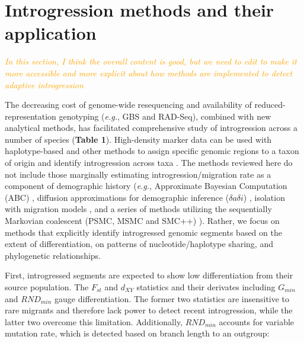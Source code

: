 \documentclass[11pt]{article}
\newcommand{\mbh}[1]{\textcolor{orange}{ \emph{\scriptsize  #1}} } %
\begin{document}
\section*{Introgression methods and their application}

\mbh{In this section, I think the overall content is good, but we need to edit to make it more accessible and more explicit about how methods are implemented to detect adaptive introgression}

The decreasing cost of genome-wide resequencing and availability of reduced-representation genotyping (\emph{e.g.}, GBS and RAD-Seq), combined with new analytical methods, has facilitated comprehensive study of introgression across a number of species (\textbf{Table 1}).
High-density marker data can be used with haplotype-based and other methods to assign specific genomic regions to a taxon of origin and identify introgression across taxa \cite{Martin2015,Price2009,Lawson2012,pease2015,rosenzweig2016,geneva2015}.
The methods reviewed here do not include those marginally estimating introgression\slash migration rate as a component of demographic history (\emph{e.g.}, Approximate Bayesian Computation (ABC) \cite{beaumont2002}, diffusion approximations for demographic inference ($\delta a\delta i$) \cite{gutenkunst2009}, isolation with migration models \cite{hey2004}, and a series of methods utilizing the sequentially Markovian coalescent (PSMC, MSMC and SMC++) \cite{li2011, schiffels2014, terhorst2017}). 
Rather, we focus on methods that explicitly identify introgressed genomic segments based on the extent of differentiation, on patterns of nucleotide/haplotype sharing, and phylogenetic relationships.

First, introgressed segments are expected to show low differentiation from their source population.
The $F_{st}$ and $d_{XY}$ statistics and their derivates including $G_{min}$ \cite{geneva2015} and $RND_{min}$\cite{rosenzweig2016} gauge differentiation. 
The former two statistics are insensitive to rare migrants and therefore lack power to detect recent introgression, while the latter two overcome this limitation.
Additionally, $RND_{min}$ accounts for variable mutation rate, which is detected based on branch length to an outgroup: 

 
\end{document}

